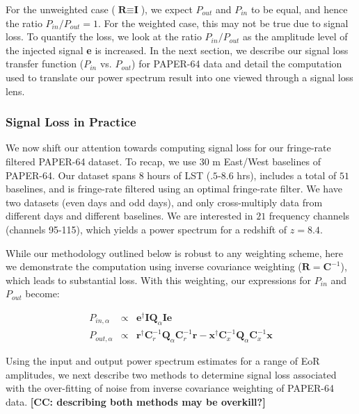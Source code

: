 \documentclass[preprint2,numberedappendix,tighten]{aastex6}  %
\newcommand{\cc}[1]{{\color{purple} \textbf{[CC: #1]}}}
\begin{document}
For the unweighted case ($\textbf{R} \equiv \textbf{I}$), we expect $P_{out}$ and $P_{in}$ to be equal, and hence the ratio $P_{in} / P_{out} = 1$. For the weighted case, this may not be true due to signal loss. To quantify the loss, we look at the ratio $P_{in}/P_{out}$ as the amplitude level of the injected signal \textbf{e} is increased. In the next section, we describe our signal loss transfer function ($P_{in}$ vs. $P_{out}$) for PAPER-64 data and detail the computation used to translate our power spectrum result into one viewed through a signal loss lens.

\subsubsection{Signal Loss in Practice}

We now shift our attention towards computing signal loss for our fringe-rate filtered PAPER-64 dataset.  To recap, we use 30 m East/West baselines of PAPER-64. Our dataset spans $8$ hours of LST ($.5$-$8.6$ hrs), includes a total of $51$ baselines, and is fringe-rate filtered using an optimal fringe-rate filter. We have two datasets (even days and odd days), and only cross-multiply data from different days and different baselines. We are interested in $21$ frequency channels (channels 95-115), which yields a power spectrum for a redshift of $z=8.4$. 

While our methodology outlined below is robust to any weighting scheme, here we demonstrate the computation using inverse covariance weighting ($\textbf{R} = \textbf{C}^{-1}$), which leads to substantial loss. With this weighting, our expressions for $P_{in}$ and $P_{out}$ become:

\begin{eqnarray}
P_{in,\alpha} &\propto& \textbf{e}^{\dagger}\textbf{I}\textbf{Q}_{\alpha}\textbf{I}\textbf{e} \\
P_{out,\alpha} &\propto& \textbf{r}^{\dagger}\textbf{C}_{r}^{-1}\textbf{Q}_{\alpha}\textbf{C}_{r}^{-1}\textbf{r} - \textbf{x}^{\dagger}\textbf{C}_{x}^{-1}\textbf{Q}_{\alpha}\textbf{C}_{x}^{-1}\textbf{x} 
\end{eqnarray}

Using the input and output power spectrum estimates for a range of EoR amplitudes, we next describe two methods to determine signal loss associated with the over-fitting of noise from inverse covariance weighting of PAPER-64 data. \cc{describing both methods may be overkill?}
\end{document}
